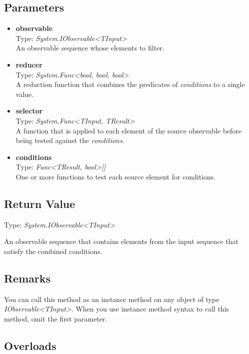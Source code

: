 \documentclass[12pt,a4paper,twoside]{report}
\begin{document}
\subsection{Parameters}
\begin{itemize}
    \item \textbf{observable}\\
        Type: \textit{System.IObservable<TInput>}\\
        An observable sequence whose elements to filter.
    \item \textbf{reducer} \\
        Type: \textit{System.Func<bool, bool, bool>} \\
        A reduction function that combines the predicates of \textit{conditions} to a single value.
    \item \textbf{selector} \\
        Type: \textit{System.Func<TInput, TResult>}\\
        A function that is applied to each element of the source observable before being tested against the \textit{conditions}.
    \item \textbf{conditions} \\
        Type: \textit{Func<TResult, bool>[]} \\
        One or more functions to test each source element for conditions.
\end{itemize}

\subsection{Return Value}
Type: \textit{System.IObservable<TInput>}

An observable sequence that contains elements from the input sequence that satisfy the combined conditions.

\subsection{Remarks}
You can call this method as an instance method on any object of type \textit{IObservable<TInput>}. When you use 
instance method syntax to call this method, omit the first parameter.

\subsection{Overloads}
\end{document}
